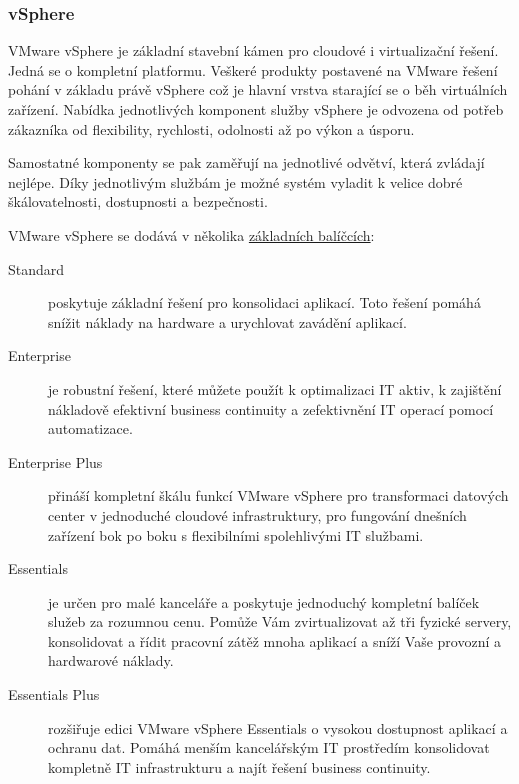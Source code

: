 \subsubsection{vSphere}
\label{sec:vSphere}
VMware vSphere je základní stavební kámen pro cloudové i virtualizační řešení. Jedná se o kompletní platformu. Veškeré produkty postavené na VMware řešení pohání v základu právě vSphere což je hlavní vrstva starající se o běh virtuálních zařízení. Nabídka jednotlivých komponent služby vSphere je odvozena od potřeb zákazníka od flexibility, rychlosti, odolnosti až po výkon a úsporu.\cite{vmware:vSphere}

Samostatné komponenty se pak zaměřují na jednotlivé odvětví, která zvládají nejlépe. Díky jednotlivým službám je možné systém vyladit k velice dobré škálovatelnosti, dostupnosti a bezpečnosti.

VMware vSphere se dodává v několika \href{http://www.vmware.com/products/vsphere/compare.html}{základních balíčcích}:
\begin{description}
	\item[Standard] poskytuje základní řešení pro konsolidaci aplikací. Toto řešení pomáhá snížit náklady na hardware a urychlovat zavádění aplikací.\cite{vmware:vSphereOldanyGroup}
	\item[Enterprise] je robustní řešení, které můžete použít k optimalizaci IT aktiv, k zajištění nákladově efektivní business continuity a zefektivnění IT operací pomocí automatizace.\cite{vmware:vSphereOldanyGroup}
	\item[Enterprise Plus] přináší kompletní škálu funkcí VMware vSphere pro transformaci datových center v jednoduché cloudové infrastruktury, pro fungování dnešních zařízení bok po boku s flexibilními spolehlivými IT službami.\cite{vmware:vSphereOldanyGroup}
	\item[Essentials] je určen pro malé kanceláře a poskytuje jednoduchý kompletní balíček služeb za rozumnou cenu. Pomůže Vám zvirtualizovat až tři fyzické servery, konsolidovat a řídit pracovní zátěž mnoha aplikací a sníží Vaše provozní a hardwarové náklady.\cite{vmware:vSphereOldanyGroup}
	\item[Essentials Plus] rozšiřuje edici VMware vSphere Essentials o vysokou dostupnost aplikací a ochranu dat. Pomáhá menším kancelářským IT prostředím konsolidovat kompletně IT infrastrukturu a najít řešení business continuity.\cite{vmware:vSphereOldanyGroup}
\end{description}

